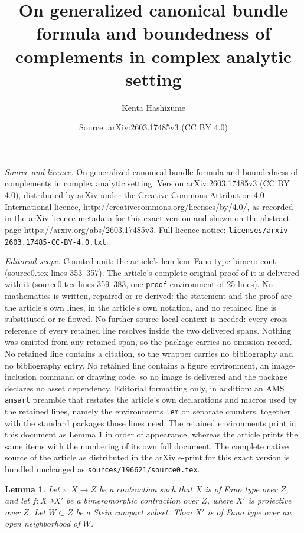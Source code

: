 \documentclass[10pt,a4paper]{amsart}
\title{On generalized canonical bundle formula and boundedness of complements in complex analytic setting}
\author{Kenta Hashizume}
\date{Source: arXiv:2603.17485v3 (CC BY 4.0)}
\newtheorem{lem}{Lemma}
\begin{document}
\maketitle

\noindent\emph{Source and licence.} On generalized canonical bundle formula and boundedness of complements in complex analytic setting. Version arXiv:2603.17485v3 (CC BY 4.0), distributed by arXiv under the Creative Commons Attribution 4.0 International licence, http://creativecommons.org/licenses/by/4.0/, as recorded in the arXiv licence metadata for this exact version and shown on the abstract page https://arxiv.org/abs/2603.17485v3. Full licence notice: \texttt{licenses/arxiv-2603.17485-CC-BY-4.0.txt}.\par\smallskip

\noindent\textit{Editorial scope.} Counted unit: the article's lem lem--Fano-type-bimero-cont (source0.tex lines 353--357). The article's complete original proof of it is delivered with it (source0.tex lines 359--383, one \texttt{proof} environment of 25 lines). No mathematics is written, repaired or re-derived: the statement and the proof are the article's own lines, in the article's own notation, and no retained line is substituted or re-flowed.  No further source-local context is needed: every cross-reference of every retained line resolves inside the two delivered spans.  Nothing was omitted from any retained span, so the package carries no omission record.  No retained line contains a citation, so the wrapper carries no bibliography and no bibliography entry.  No retained line contains a figure environment, an image-inclusion command or drawing code, so no image is delivered and the package declares no asset dependency.  Editorial formatting only, in addition: an AMS \texttt{amsart} preamble that restates the article's own declarations and macros used by the retained lines, namely the environments \texttt{lem} on separate counters, together with the standard packages those lines need.  The retained environments print in this document as Lemma 1 in order of appearance, whereas the article prints the same items with the numbering of its own full document.  The complete native source of the article as distributed in the arXiv e-print for this exact version is bundled unchanged as \texttt{sources/196621/source0.tex}.
\begin{lem}\label{lem--Fano-type-bimero-cont}
Let $\pi \colon X \to Z$ be a contraction such that $X$ is of Fano type over $Z$, and let $f\colon X \dashrightarrow X'$ be a  bimeromorphic contraction over $Z$, where $X'$ is projective over $Z$. 
Let $W \subset Z$ be a Stein compact subset. 
Then $X'$ is of Fano type over an open neighborhood of $W$.
\end{lem}
\end{document}
